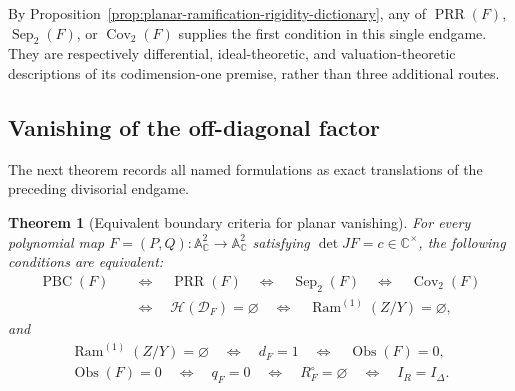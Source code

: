\documentclass[11pt]{article}
\newtheorem{theorem}{Theorem}[section]
\theoremstyle{remark}
\theoremstyle{definition}
\DeclareMathOperator{\Ram}{Ram}
\newcommand{\A}{\mathbb A}
\newcommand{\C}{\mathbb C}
\newcommand{\Obs}{\operatorname{Obs}}
\begin{document}
By Proposition~\ref{prop:planar-ramification-rigidity-dictionary}, any of
\(\operatorname{PRR}(F)\), \(\operatorname{Sep}_2(F)\), or
\(\operatorname{Cov}_2(F)\) supplies the first condition in this single
endgame.  They are respectively differential, ideal-theoretic, and
valuation-theoretic descriptions of its codimension-one premise, rather
than three additional routes.

\subsection{Vanishing of the off-diagonal factor}

The next theorem records all named formulations as exact translations of
the preceding divisorial endgame.

\begin{theorem}[Equivalent boundary criteria for planar vanishing]
\label{thm:planar-vanishing}
For every polynomial map
\(F=(P,Q)\colon\A^2_{\C}\to\A^2_{\C}\) satisfying
\(\det JF=c\in\C^\times\), the following conditions are equivalent:
\[
  \begin{aligned}
    \operatorname{PBC}(F)
    &\quad\Longleftrightarrow\quad \operatorname{PRR}(F)
     \quad\Longleftrightarrow\quad \operatorname{Sep}_2(F)
     \quad\Longleftrightarrow\quad \operatorname{Cov}_2(F)\\
    &\quad\Longleftrightarrow\quad \mathcal H(\mathcal D_F)=\varnothing
     \quad\Longleftrightarrow\quad \Ram^{(1)}(Z/Y)=\varnothing,
  \end{aligned}
\]
and
\[
  \begin{gathered}
    \Ram^{(1)}(Z/Y)=\varnothing
    \quad\Longleftrightarrow\quad
    d_F=1
    \quad\Longleftrightarrow\quad
    \Obs(F)=0,\\
    \Obs(F)=0
    \quad\Longleftrightarrow\quad
    q_F=0
    \quad\Longleftrightarrow\quad
    R_F^\circ=\varnothing
    \quad\Longleftrightarrow\quad
    I_R=I_\Delta.
  \end{gathered}
\]
\end{theorem}
\end{document}

